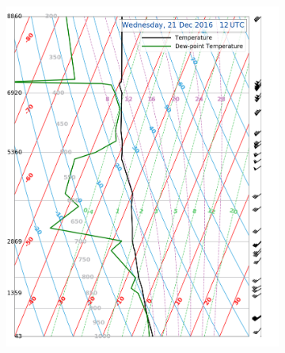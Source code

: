 \begin{landscape}
\begin{figure}
\begin{subfigure}[b]{0.66\textheight}
			\caption{}\label{fig:Soun20}
		\end{subfigure}
		\quad
		\begin{subfigure}[b]{0.66\textheight}
			\includegraphics[trim={0cm 0.2cm 2.5cm .5cm},clip,width=\textwidth]{./fig_Sounding/20161221_12Z}
			\caption{}\label{fig:Soun21}
		\end{subfigure}
	\end{figure}
	

\end{landscape}
